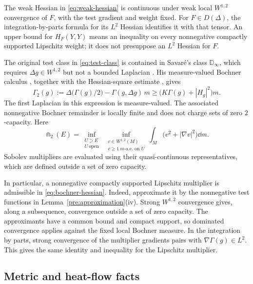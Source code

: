 The weak Hessian in \eqref{eq:weak-hessian} is continuous under weak
local \(W^{1,2}\) convergence of \(F\), with the test gradient and
weight fixed. For \(F\in D(\Delta)\), the integration-by-parts
formula for its \(L^2\) Hessian identifies it with that tensor.
An upper bound for \(H_F(Y,Y)\) means an inequality on every
nonnegative compactly supported Lipschitz weight; it does not
presuppose an \(L^2\) Hessian for \(F\).

The original test class in \eqref{eq:test-class} is contained in
Savar\'e's class \(\mathbb D_\infty\), which requires
\(\Delta g\in W^{1,2}\) but not a bounded Laplacian
\cite[Equation~(3.4)]{Savare2014}.
His measure-valued Bochner calculus
\cite[Lemma~3.2 and Equations~(3.7)--(3.9)]{Savare2014},
together with the Hessian-square estimate
\cite[Theorem~3.3.8]{Gigli2018}, gives
\begin{equation}
\label{eq:bochner-hessian}
\Gamma_2(g):=
\Delta\bigl(\Gamma(g)/2\bigr)
-\Gamma(g,\Delta g)\,m
\ge \bigl(K\Gamma(g)+|H_g|^2\bigr)m.
\end{equation}
The first Laplacian in this expression is measure-valued.
The associated nonnegative Bochner remainder is locally finite
and does not charge sets of zero \(2\)-capacity. Here
\[
\Cap_2(E)=
\inf_{\substack{U\supset E\\U\ \mathrm{open}}}
\ \inf_{\substack{v\in W^{1,2}(M)\\v\ge1\ m\text{-a.e.\ on }U}}
\int_M\bigl(v^2+|\nabla v|^2\bigr)\dd m.
\]
Sobolev multipliers are evaluated using their quasi-continuous
representatives, which are defined outside a set of zero capacity.

In particular, a nonnegative compactly supported Lipschitz
multiplier is admissible in \eqref{eq:bochner-hessian}.
Indeed, approximate it by the nonnegative test functions in
Lemma~\ref{pre:approximation}\textup{(iv)}. Strong
\(W^{1,2}\) convergence gives, along a subsequence, convergence
outside a set of zero capacity. The approximants have a common
bound and compact support, so dominated convergence applies
against the fixed local Bochner measure. In the integration by
parts, strong convergence of the multiplier gradients pairs
with \(\nabla\Gamma(g)\in L^2\). This gives the same identity
and inequality for the Lipschitz multiplier.

\subsection{Metric and heat-flow facts}

